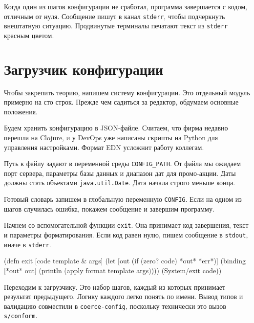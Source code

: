 
Когда один из шагов конфигурации не сработал, программа завершается с кодом,
отличным от нуля. Сообщение пишут в канал \verb|stderr|, чтобы подчеркнуть
внештатную ситуацию. Продвинутые терминалы печатают текст из \verb|stderr|
красным цветом.

\section{Загрузчик конфигурации}


Чтобы закрепить теорию, напишем систему конфигурации. Это отдельный модуль
примерно на сто строк. Прежде чем садиться за редактор, обдумаем основные
положения.

Будем хранить конфигурацию в JSON-файле. Считаем, что фирма недавно перешла на
Clojure, и у DevOps уже написаны скрипты на Python для управления
настройками. Формат EDN усложнит работу коллегам.


Путь к файлу задают в переменной среды \verb|CONFIG_PATH|. От файла мы ожидаем
порт сервера, параметры базы данных и диапазон дат для промо-акции. Даты должны
стать объектами \verb|java.util.Date|. Дата начала строго меньше конца.

Готовый словарь запишем в глобальную переменную \verb|CONFIG|. Если на одном
из шагов случилась ошибка, покажем сообщение и завершим программу.

Начнем со вспомогательной функции \verb|exit|. Она принимает код завершения,
текст и параметры форматирования. Если код равен нулю, пишем сообщение в
\verb|stdout|, иначе в \verb|stderr|.


\begin{english}
  \begin{clojure}
(defn exit
  [code template & args]
  (let [out (if (zero? code) *out* *err*)]
    (binding [*out* out]
      (println (apply format template args))))
  (System/exit code))
  \end{clojure}
\end{english}

Переходим к загрузчику. Это набор шагов, каждый из которых принимает результат
предыдущего. Логику каждого легко понять по имени. Вывод типов и валидацию
совместили в \verb|coerce-config|, поскольку технически это вызов
\verb|s/conform|.

